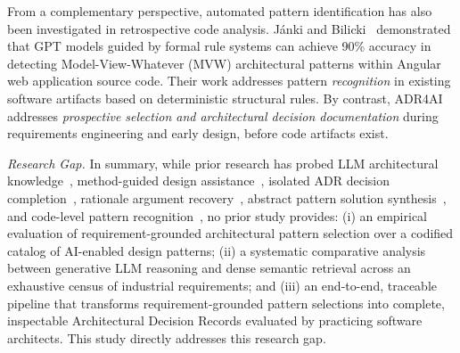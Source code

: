 From a complementary perspective, automated pattern identification has also been
investigated in retrospective code analysis. J{\'a}nki and Bilicki~\cite{janki2023recognition}
demonstrated that GPT models guided by formal rule systems can achieve 90\%
accuracy in detecting Model-View-Whatever (MVW) architectural patterns within
Angular web application source code. Their work addresses pattern \emph{recognition}
in existing software artifacts based on deterministic structural rules. By contrast,
ADR4AI addresses \emph{prospective selection and architectural decision documentation}
during requirements engineering and early design, before code artifacts exist.

\emph{Research Gap.}
In summary, while prior research has probed LLM architectural knowledge~\cite{soliman2025architectural},
method-guided design assistance~\cite{cervantes2026assistants,cervantes2025add},
isolated ADR decision completion~\cite{dhar2024generating}, rationale argument
recovery~\cite{zhou2026rationale}, abstract pattern solution synthesis~\cite{oliveira2026designpartners},
and code-level pattern recognition~\cite{janki2023recognition}, no prior study provides:
(i) an empirical evaluation of requirement-grounded architectural pattern selection
over a codified catalog of AI-enabled design patterns;
(ii) a systematic comparative analysis between generative LLM reasoning and dense
semantic retrieval across an exhaustive census of industrial requirements; and
(iii) an end-to-end, traceable pipeline that transforms requirement-grounded pattern
selections into complete, inspectable Architectural Decision Records evaluated by
practicing software architects.
This study directly addresses this research gap.



